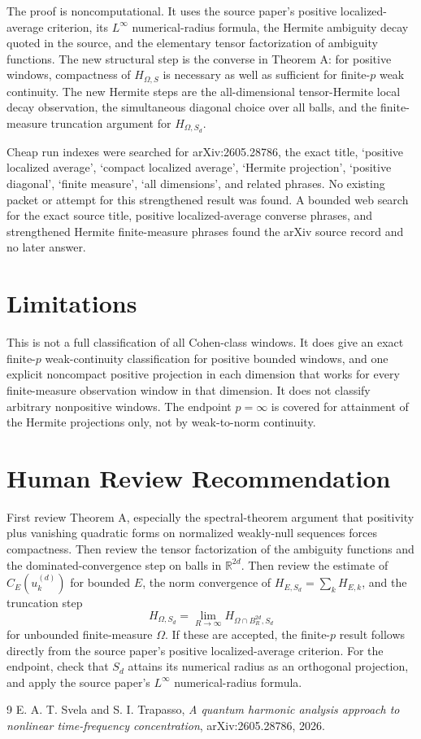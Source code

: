 \documentclass[11pt]{amsart}
\newcommand{\R}{\mathbb R}
\begin{document}
The proof is noncomputational.  It uses the source paper's positive localized-average criterion, its \(L^\infty\) numerical-radius formula, the Hermite ambiguity decay quoted in the source, and the elementary tensor factorization of ambiguity functions.  The new structural step is the converse in Theorem A: for positive windows, compactness of \(H_{\Omega,S}\) is necessary as well as sufficient for finite-\(p\) weak continuity.  The new Hermite steps are the all-dimensional tensor-Hermite local decay observation, the simultaneous diagonal choice over all balls, and the finite-measure truncation argument for \(H_{\Omega,S_d}\).

Cheap run indexes were searched for arXiv:2605.28786, the exact title, `positive localized average', `compact localized average', `Hermite projection', `positive diagonal', `finite measure', `all dimensions', and related phrases.  No existing packet or attempt for this strengthened result was found.  A bounded web search for the exact source title, positive localized-average converse phrases, and strengthened Hermite finite-measure phrases found the arXiv source record and no later answer.

\section*{Limitations}

This is not a full classification of all Cohen-class windows.  It does give an exact finite-\(p\) weak-continuity classification for positive bounded windows, and one explicit noncompact positive projection in each dimension that works for every finite-measure observation window in that dimension.  It does not classify arbitrary nonpositive windows.  The endpoint \(p=\infty\) is covered for attainment of the Hermite projections only, not by weak-to-norm continuity.

\section*{Human Review Recommendation}

First review Theorem A, especially the spectral-theorem argument that positivity plus vanishing quadratic forms on normalized weakly-null sequences forces compactness.  Then review the tensor factorization of the ambiguity functions and the dominated-convergence step on balls in \(\R^{2d}\).  Then review the estimate of \(C_E(u_k^{(d)})\) for bounded \(E\), the norm convergence of \(H_{E,S_d}=\sum_kH_{E,k}\), and the truncation step
\[
H_{\Omega,S_d}=\lim_{R\to\infty}H_{\Omega\cap B_R^{2d},S_d}
\]
for unbounded finite-measure \(\Omega\).  If these are accepted, the finite-\(p\) result follows directly from the source paper's positive localized-average criterion.  For the endpoint, check that \(S_d\) attains its numerical radius as an orthogonal projection, and apply the source paper's \(L^\infty\) numerical-radius formula.

\begin{thebibliography}{9}
E. A. T. Svela and S. I. Trapasso,
\emph{A quantum harmonic analysis approach to nonlinear time-frequency concentration},
arXiv:2605.28786, 2026.
\end{thebibliography}
\end{document}
